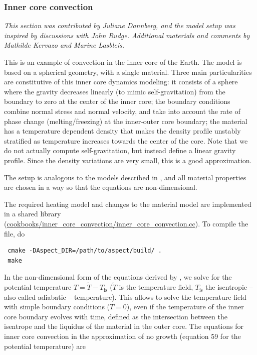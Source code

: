 \documentclass{article}
\begin{document}
\subsubsection{Inner core convection}
\label{sec:cookbooks-inner-core-convection}

\textit{This section was contributed by Juliane Dannberg, and the model setup was inspired 
by discussions with John Rudge. Additional materials and comments by Mathilde Kervazo and Marine Lasbleis.}

This is an example of convection in the inner core of the Earth. The model is based on a spherical geometry, with a single material. Three main particularities are constitutive of this inner core dynamics modeling: it consists of a sphere where the gravity decreases linearly (to mimic self-gravitation) from the boundary to zero at the center of the inner core; the boundary conditions combine normal stress and normal velocity, and take into account the rate of phase change (melting/freezing) at the inner-outer core boundary; the material has a temperature dependent density that makes the density profile unstably stratified as temperature increases towards the center of the core.
Note that we do not actually compute self-gravitation, but instead define a linear gravity profile. Since the density variations are very small, this is a good approximation.

The setup is analogous to the models described in \cite{Deguen2013}, and all material properties 
are chosen in a way so that the equations are non-dimensional.

The required heating model and changes to the material model are implemented in a shared library
(\url{cookbooks/inner_core_convection/inner_core_convection.cc}). To compile the file, do

\begin{verbatim}
 cmake -DAspect_DIR=/path/to/aspect/build/ .
 make
\end{verbatim}

In the non-dimensional form of the equations derived by \cite{Deguen2013}, we solve for the potential temperature $T = \tilde{T}-T_{\text{is}}$ ($\tilde{T}$ is the temperature field, $T_{\text{is}}$ the isentropic -- also called adiabatic -- temperature). This allows to solve the temperature field with simple boundary conditions ($T=0$), even if the temperature of the inner core boundary evolves with time, defined as the intersection between the isentrope and the liquidus of the material in the outer core.  
The equations for inner core convection in the approximation of no growth (equation 59 for the potential temperature) are
\end{document}
